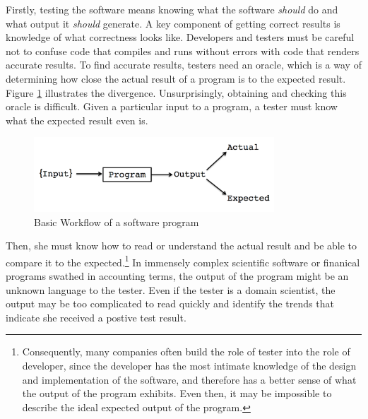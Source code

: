 Firstly, testing the software means knowing what the software \textit{should} do and what output it \textit{should} generate. A key component of getting correct results is knowledge of what correctness looks like. Developers and testers must be careful not to confuse code that compiles and runs without errors with code that renders accurate results. To find accurate results, testers need an oracle, which is a way of determining how close the actual result of a program is to the expected result. Figure \ref{fig:workflow} illustrates the divergence. Unsurprisingly, obtaining and checking this oracle is difficult. Given a particular input to a program, a tester must know what the expected result even is. 
\begin{figure}
\centering
\includegraphics[width=90mm,scale=0.5]{diagram.png}
\caption{Basic Workflow of a software program}
\label{fig:workflow}
\end{figure}
Then, she must know how to read or understand the actual result and be able to compare it to the expected.\footnote{Consequently, many companies often build the role of tester into the role of developer, since the developer has the most intimate knowledge of the design and implementation of the software, and therefore has a better sense of what the output of the program exhibits. Even then, it may be impossible to describe the ideal expected output of the program.} In immensely complex scientific software or finanical programs swathed in accounting terms, the output of the program might be an unknown language to the tester. Even if the tester is a domain scientist, the output may be too complicated to read quickly and identify the trends that indicate she received a postive test result.

